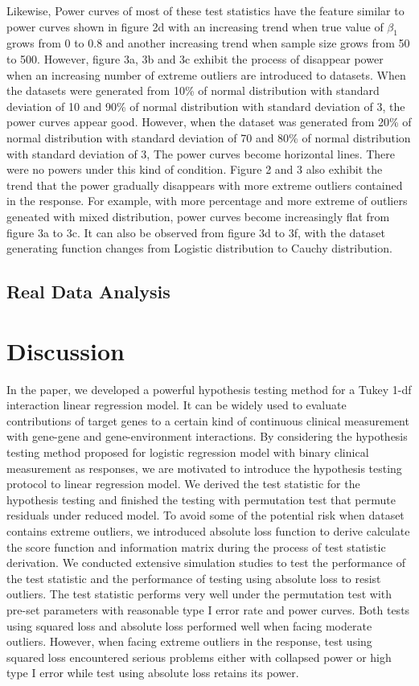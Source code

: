 \documentclass[12pt]{article}
\begin{document}
Likewise, Power curves of most of these test statistics have the feature similar to power curves shown in figure 2d with an increasing trend when true value of $\beta_1$ grows from 0 to 0.8 and another increasing trend when sample size grows from 50 to 500. However, figure 3a, 3b and 3c exhibit the process of disappear power when an increasing number of extreme outliers are introduced to datasets. When the datasets were generated from 10\% of normal distribution with standard deviation of 10 and 90\% of normal distribution with standard deviation of 3, the power curves appear good. However, when the dataset was generated from 20\% of normal distribution with standard deviation of 70 and 80\% of normal distribution with standard deviation of 3, The power curves become horizontal lines. There were no powers under this kind of condition. Figure 2 and 3 also exhibit the trend that the power gradually disappears with more extreme outliers contained in the response. For example, with more percentage and more extreme of outliers geneated with mixed distribution, power curves become increasingly flat from figure 3a to 3c. It can also be observed from figure 3d to 3f, with the dataset generating function changes from Logistic distribution to Cauchy distribution.


\subsection{Real Data Analysis}

\section{Discussion}
In the paper, we developed a powerful hypothesis testing method for a Tukey 1-df interaction linear regression model. It can be widely used to evaluate contributions of target genes to a certain kind of continuous clinical measurement with gene-gene and gene-environment interactions. By considering the hypothesis testing method proposed for logistic regression model with binary clinical measurement as responses, we are motivated to introduce the hypothesis testing protocol to linear regression model. We derived the test statistic for the hypothesis testing and finished the testing with permutation test that permute residuals under reduced model. To avoid some of the potential risk when dataset contains extreme outliers, we introduced absolute loss function to derive calculate the score function and information matrix during the process of test statistic derivation. We conducted extensive simulation studies to test the performance of the test statistic and the performance of testing using absolute loss to resist outliers. The test statistic performs very well under the permutation test with pre-set parameters with reasonable type I error rate and power curves. Both tests using squared loss and absolute loss performed well when facing moderate outliers. However, when facing extreme outliers in the response, test using squared loss encountered serious problems either with collapsed power or high type I error while test using absolute loss retains its power.
\end{document}
